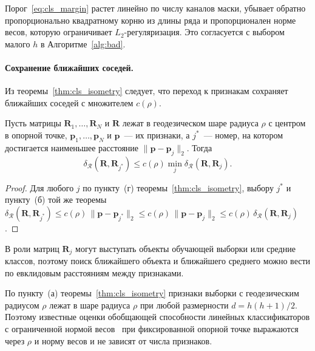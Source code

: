 Порог~\eqref{eq:cls_margin} растет линейно по числу каналов маски, убывает обратно пропорционально квадратному корню из длины ряда и пропорционален норме весов, которую ограничивает $L_2$-регуляризация. Это согласуется с выбором малого $h$ в Алгоритме~\ref{alg:bad}.

\paragraph{Сохранение ближайших соседей.} Из теоремы~\ref{thm:cls_isometry} следует, что переход к признакам сохраняет ближайших соседей с множителем $c(\rho)$.

\begin{corollary}\label{cor:cls_nn}
Пусть матрицы $\mathbf{R}_1, \ldots, \mathbf{R}_N$ и $\mathbf{R}$ лежат в геодезическом шаре радиуса $\rho$ с центром в опорной точке, $\mathbf{p}_1, \ldots, \mathbf{p}_N$ и $\mathbf{p}$~--- их признаки, а $j^{*}$~--- номер, на котором достигается наименьшее расстояние $\|\mathbf{p} - \mathbf{p}_j\|_2$. Тогда
\begin{equation*}
\delta_{\mathcal{R}}(\mathbf{R}, \mathbf{R}_{j^{*}}) \leqslant c(\rho) \min_{j} \delta_{\mathcal{R}}(\mathbf{R}, \mathbf{R}_j).
\end{equation*}
\end{corollary}
\begin{proof}
Для любого $j$ по пункту~(г) теоремы~\ref{thm:cls_isometry}, выбору $j^{*}$ и пункту~(б) той же теоремы $\delta_{\mathcal{R}}(\mathbf{R}, \mathbf{R}_{j^{*}}) \leqslant c(\rho)\,\|\mathbf{p} - \mathbf{p}_{j^{*}}\|_2 \leqslant c(\rho)\,\|\mathbf{p} - \mathbf{p}_j\|_2 \leqslant c(\rho)\,\delta_{\mathcal{R}}(\mathbf{R}, \mathbf{R}_j)$.
\end{proof}

В роли матриц $\mathbf{R}_j$ могут выступать объекты обучающей выборки или средние классов, поэтому поиск ближайшего объекта и ближайшего среднего можно вести по евклидовым расстояниям между признаками.

\begin{remark}
По пункту~(а) теоремы~\ref{thm:cls_isometry} признаки выборки с геодезическим радиусом $\rho$ лежат в шаре радиуса $\rho$ при любой размерности $d = h(h+1)/2$. Поэтому известные оценки обобщающей способности линейных классификаторов с ограниченной нормой весов~\cite[глава~5]{mohri2018foundations} при фиксированной опорной точке выражаются через $\rho$ и норму весов и не зависят от числа признаков.
\end{remark}

